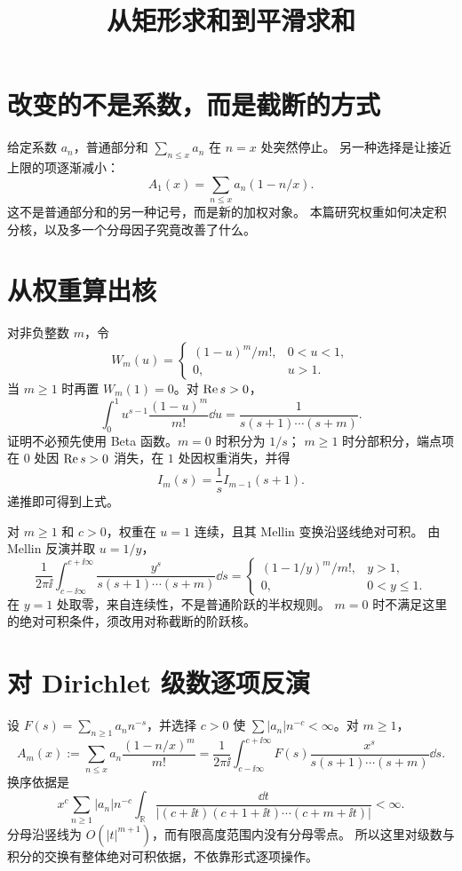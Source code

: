 \documentclass[UTF8,fontset=fandol,11pt]{ctexart}
\title{从矩形求和到平滑求和}
\begin{document}
\maketitle
\draftnotice
\section{改变的不是系数，而是截断的方式}
给定系数 $a_n$，普通部分和 $\sum_{n\le x}a_n$ 在 $n=x$ 处突然停止。
另一种选择是让接近上限的项逐渐减小：
\[
 A_1(x)=\sum_{n\le x}a_n(1-n/x).
\]
这不是普通部分和的另一种记号，而是新的加权对象。
本篇研究权重如何决定积分核，以及多一个分母因子究竟改善了什么。

\section{从权重算出核}
对非负整数 $m$，令
\[
 W_m(u)=
 \begin{cases}(1-u)^m/m!,&0<u<1,\\0,&u>1.\end{cases}
\]
当 $m\ge1$ 时再置 $W_m(1)=0$。对 $\operatorname{Re} s>0$，
\[
 \int_0^1u^{s-1}\frac{(1-u)^m}{m!}\dd u
 =\frac1{s(s+1)\cdots(s+m)}.
\]
证明不必预先使用 Beta 函数。$m=0$ 时积分为 $1/s$；
$m\ge1$ 时分部积分，端点项在 $0$ 处因 $\operatorname{Re} s>0$ 消失，在 $1$ 处因权重消失，并得
\[
 I_m(s)=\frac1s I_{m-1}(s+1).
\]
递推即可得到上式。

对 $m\ge1$ 和 $c>0$，权重在 $u=1$ 连续，且其 Mellin 变换沿竖线绝对可积。
由 Mellin 反演并取 $u=1/y$，
\[
 \frac1{2\pi\ii}\int_{c-\ii\infty}^{c+\ii\infty}
 \frac{y^s}{s(s+1)\cdots(s+m)}\dd s
 =
 \begin{cases}
 (1-1/y)^m/m!,&y>1,\\
 0,&0<y\le1.
 \end{cases}
\]
在 $y=1$ 处取零，来自连续性，不是普通阶跃的半权规则。
$m=0$ 时不满足这里的绝对可积条件，须改用对称截断的阶跃核。

\section{对 Dirichlet 级数逐项反演}
设 $F(s)=\sum_{n\ge1}a_nn^{-s}$，并选择 $c>0$ 使
$\sum |a_n|n^{-c}<\infty$。对 $m\ge1$，
\[
 A_m(x):=\sum_{n\le x}a_n\frac{(1-n/x)^m}{m!}
 =\frac1{2\pi\ii}\int_{c-\ii\infty}^{c+\ii\infty}
   F(s)\frac{x^s}{s(s+1)\cdots(s+m)}\dd s.
\]
换序依据是
\[
 x^c\sum_{n\ge1}|a_n|n^{-c}
 \int_{\mathbb R}
 \frac{\dd t}{|(c+\ii t)(c+1+\ii t)\cdots(c+m+\ii t)|}<\infty.
\]
分母沿竖线为 $O(|t|^{m+1})$，而有限高度范围内没有分母零点。
所以这里对级数与积分的交换有整体绝对可积依据，不依靠形式逐项操作。
\end{document}
